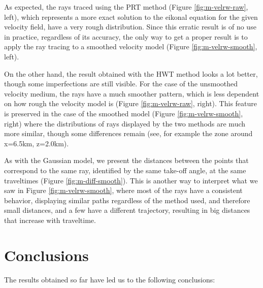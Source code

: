 \par
As expected, the rays traced using the PRT method (Figure
\ref{fig:m-velrw-raw}, left), which represents a more exact solution to the
eikonal equation for the given velocity field, have a very rough
distribution. Since this erratic result is of no use in practice,
regardless of its accuracy, the only way to get a proper result is to
apply the ray tracing to a smoothed velocity model (Figure
\ref{fig:m-velrw-smooth}, left).
\par
On the other hand, the result obtained with the HWT method looks a lot
better, though some imperfections are still visible. For the case of the
unsmoothed velocity medium, the rays have a much smoother pattern, which
is less dependent on how rough the velocity model is (Figure
\ref{fig:m-velrw-raw}, right). This feature is preserved in the case of
the smoothed model (Figure \ref{fig:m-velrw-smooth}, right) where the
distributions of rays displayed by the two methods are much more
similar, though some differences remain (see, for example the zone
around x=6.5km, z=2.0km).
\par
As with the Gaussian model, we present the distances between the points
that correspond to the same ray, identified by the same take-off angle,
at the same traveltimes (Figure \ref{fig:m-diff-smooth}). This is another way
to interpret what we saw in Figure \ref{fig:m-velrw-smooth}, where most
of the rays have a consistent behavior, displaying similar paths regardless
of the method used, and therefore small distances, and a few have a
different trajectory, resulting in big distances that increase with
traveltime.


\section{Conclusions}

The results obtained so far have led us to the following conclusions:

